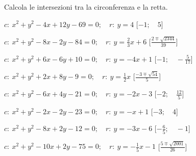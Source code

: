 \subsubsection*{}

\begin{esercizio}\label{ese:}
 Calcola le intersezioni tra la circonferenza e la retta.
 \begin{enumeratea}
  \item  \(c:~x^2 + y^2 -4x +12y -69 = 0; \quad r:~y = 4\)
   \hfill [\(-1; \quad 5\)]
  \item  \(c:~x^2 + y^2 -8x -2y -84 = 0; \quad r:~y = \frac{2}{3} x +6\)
   \hfill [\(\frac{2 \mp \sqrt{2344}}{39}\)]
  \item  \(c:~x^2 + y^2 +6x -6y +10 = 0; \quad r:~y = -4 x +1\)
   \hfill [\(-1; \quad -\frac{5}{17}\)]
  \item  \(c:~x^2 + y^2 +2x +8y -9 = 0; \quad r:~y = \frac{1}{2} x \)
   \hfill [\(\frac{-3 \mp \sqrt{54}}{5}\)]
  \item  \(c:~x^2 + y^2 -6x +4y -21 = 0; \quad r:~y = -2 x -3\)
   \hfill [\(-2; \quad \frac{12}{5}\)]
  \item  \(c:~x^2 + y^2 -2x -2y -23 = 0; \quad r:~y = - x +1\)
   \hfill [\(-3; \quad 4\)]
  \item  \(c:~x^2 + y^2 -8x +2y -12 = 0; \quad r:~y = -3 x -6\)
   \hfill [\(-\frac{6}{5}; \quad -1\)]
  \item  \(c:~x^2 + y^2 -10x +2y -75 = 0; \quad r:~y = -\frac{1}{5} x -1\)
   \hfill [\(\frac{5 \mp \sqrt{2001}}{26}\)]
 \end{enumeratea}
\end{esercizio}


